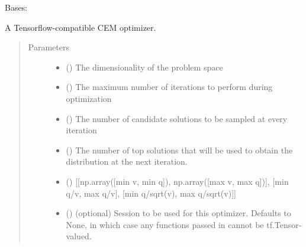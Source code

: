 \documentclass[letterpaper,10pt,english,openany,oneside]{sphinxmanual}
\begin{document}
\begin{fulllineitems}
\label{\detokenize{_modules/misc.optimizers:misc.optimizers.cem.CEMOptimizer}}
Bases: {\hyperref[\detokenize{_modules/misc.optimizers:misc.optimizers.optimizer.Optimizer}]{}}

A Tensorflow-compatible CEM optimizer.
\begin{quote}\begin{description}
\item[{Parameters}] \leavevmode\begin{itemize}
\item {} 
 () \textendash{} The dimensionality of the problem space

\item {} 
 () \textendash{} The maximum number of iterations to perform during optimization

\item {} 
 () \textendash{} The number of candidate solutions to be sampled at every iteration

\item {} 
 () \textendash{} The number of top solutions that will be used to obtain the distribution at the next iteration.

\item {} 
 () \textendash{} {[}{[}np.array({[}min v, min q{]}), np.array({[}max v, max q{]}){]}, {[}min q/v, max q/v{]}, {[}min q/sqrt(v), max q/sqrt(v){]}{]}

\item {} 
 () \textendash{} (optional) Session to be used for this optimizer. Defaults to None, in which case any functions passed in cannot be tf.Tensor-valued.


\end{itemize}
\end{description}
\end{quote}
\end{fulllineitems}
\end{document}
